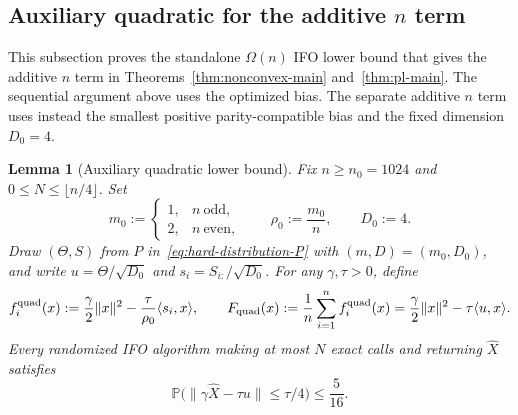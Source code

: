 \documentclass{article}
\newtheorem{lemma}[theorem]{Lemma}
\theoremstyle{definition}
\newcommand{\Prob}{\mathbb{P}}
\begin{document}
\subsection{Auxiliary quadratic for the additive \texorpdfstring{$n$}{n} term}

This subsection proves the standalone $\Omega(n)$ IFO lower bound that gives
the additive $n$ term in Theorems~\ref{thm:nonconvex-main}
and~\ref{thm:pl-main}.
The sequential argument above uses the optimized bias.  The separate additive
$n$ term uses instead the smallest positive parity-compatible bias and the
fixed dimension $D_0=4$.

\begin{lemma}[Auxiliary quadratic lower bound]
\label{lem:dense-quadratic-row-bound}
Fix $n\ge n_0=1024$ and $0\le N\le\lfloor n/4\rfloor$.  Set
\begin{equation}
 m_0:=
 \begin{cases}
  1,&n\ \text{odd},\\
  2,&n\ \text{even},
 \end{cases}
 \qquad
 \rho_0:=\frac{m_0}{n},
 \qquad
 D_0:=4.
 \label{eq:low-bias-quadratic-parameters}
\end{equation}
Draw $(\Theta,S)$ from $P$ in~\eqref{eq:hard-distribution-P} with
$(m,D)=(m_0,D_0)$, and write
$u=\Theta/\sqrt{D_0}$ and $s_i=S_{i:}/\sqrt{D_0}$.  For any
$\gamma,\tau>0$, define
\begin{equation}
 f_i^{\rm quad}(x):=\frac\gamma2\|x\|^2
 -\frac\tau{\rho_0}\langle s_i,x\rangle,
 \qquad
 F_{\rm quad}(x):=\frac1n\sum_{i=1}^nf_i^{\rm quad}(x)
 =\frac\gamma2\|x\|^2-\tau\langle u,x\rangle.
\end{equation}
Every randomized IFO algorithm making at most $N$ exact calls and returning
$\widehat X$ satisfies
\begin{equation}
 \Prob\bigl(\|\gamma\widehat X-\tau u\|\le\tau/4\bigr)
 \le\frac5{16}.
 \label{eq:low-bias-quadratic-success}
\end{equation}
\end{lemma}
\end{document}
